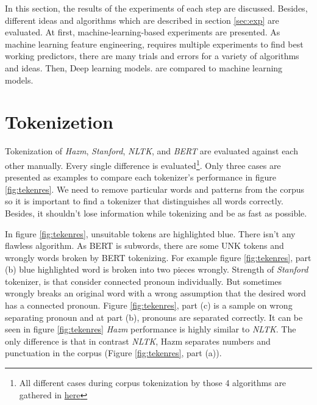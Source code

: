 In this section, the results of the experiments of each step are discussed. Besides, different ideas and algorithms which are described in section \ref{sec:exp} are evaluated. At first, machine-learning-based experiments are presented. As machine learning feature engineering, requires multiple experiments to find best working predictors, there are many trials and errors for a variety of algorithms and ideas. Then, Deep learning models. are compared to machine learning models.
\section{Tokenizetion}
Tokenization of \textit{Hazm}, \textit{Stanford}, \textit{NLTK}, and \textit{BERT} are evaluated against each other manually. Every single difference is evaluated\footnote{All different cases during corpus tokenization by those 4 algorithms are gathered in \href{https://docs.google.com/document/d/1SlRBnoyLntLJ5yalWXZ1EqJ0wRj4DyiEMJdewkEkrTM/edit?usp=sharing}{here}}. Only three cases are presented as examples to compare each tokenizer's performance in figure \ref{fig:tekenres}. We need to remove particular words and patterns from the corpus so  it is important to find a tokenizer that distinguishes all words correctly. Besides, it shouldn't lose information while tokenizing and be as fast as possible. 

In figure \ref{fig:tekenres}, unsuitable tokens are highlighted  blue. There isn't any flawless algorithm. As BERT is  subwords, there are some UNK tokens and wrongly words broken by BERT tokenizing. For example figure \ref{fig:tekenres}, part (b) blue highlighted word is broken into two pieces wrongly. Strength of \textit{Stanford} tokenizer, is that consider connected pronoun individually. But sometimes  wrongly breaks an original word with a wrong assumption that the desired word has a connected pronoun. Figure \ref{fig:tekenres}, part (c) is a sample on wrong separating pronoun and at part (b), pronouns are separated correctly. It can be seen in figure \ref{fig:tekenres} \textit{Hazm} performance is highly similar to \textit{NLTK}. The only difference is that in contrast \textit{NLTK}, Hazm separates numbers and punctuation in the corpus (Figure \ref{fig:tekenres}, part (a)). 

